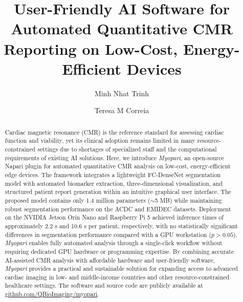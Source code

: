 \documentclass[runningheads]{llncs}
\begin{document}
%
\title{User-Friendly AI Software for Automated Quantitative CMR Reporting on Low-Cost, Energy-Efficient Devices}
%
\author{Minh Nhat Trinh \and
Teresa M Correia
} 
%
%


  
\maketitle              %
%
\begin{abstract}

Cardiac magnetic resonance (CMR) is the reference standard for assessing cardiac function and viability, yet its clinical adoption remains limited in many resource-constrained settings due to shortages of specialized staff and the computational requirements of existing AI solutions. Here, we introduce \textit{Myopari}, an open-source Napari plugin for automated quantitative CMR analysis on low-cost, energy-efficient edge devices. The framework integrates a lightweight FC-DenseNet segmentation model with automated biomarker extraction, three-dimensional visualization, and structured patient report generation within an intuitive graphical user interface. The proposed model contains only 1.4 million parameters ($\sim$5 MB) while maintaining robust segmentation performance on the ACDC and EMIDEC datasets. Deployment on the NVIDIA Jetson Orin Nano and Raspberry Pi 5 achieved inference times of approximately 2.2 s and 10.6 s per patient, respectively, with no statistically significant differences in segmentation performance compared with a GPU workstation ($p>0.05$). \textit{Myopari} enables fully automated analysis through a single-click workflow without requiring dedicated GPU hardware or programming expertise. By combining accurate AI-assisted CMR analysis with affordable hardware and user-friendly software, \textit{Myopari} provides a practical and sustainable solution for expanding access to advanced cardiac imaging in low- and middle-income countries and other resource-constrained healthcare settings. The software and source code are publicly available at \href{https://github.com/QBioImaging/myopari}{github.com/QBioImaging/myopari}. 
\end{abstract}
\end{document}
